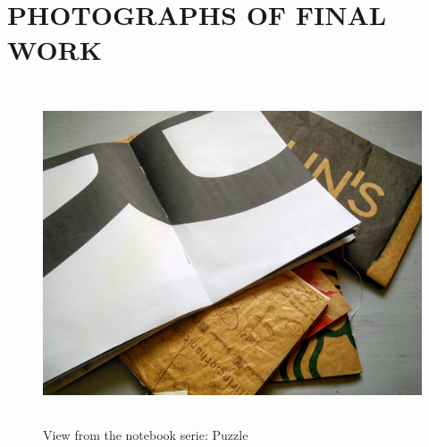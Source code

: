 \chapter{PHOTOGRAPHS OF FINAL WORK}

\begin{figure}[h!]
  \centering
  \includegraphics[height=10cm]{project_graphics/notebooks_puzzle_open.jpg}
  \caption{View from the notebook serie: Puzzle}
  \label{fig:CollectedAllTogether}
\end{figure}



